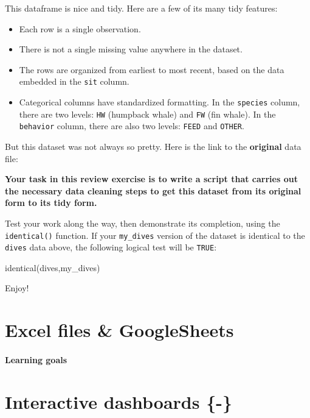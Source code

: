 \documentclass[
]{book}
\newenvironment{Shaded}{\begin{snugshade}}{\end{snugshade}}
\newcommand{\FunctionTok}[1]{\textcolor[rgb]{0.00,0.00,0.00}{#1}}
\newcommand{\NormalTok}[1]{#1}
\begin{document}
This dataframe is nice and tidy. Here are a few of its many tidy features:

\begin{itemize}
\item
  Each row is a single observation.
\item
  There is not a single missing value anywhere in the dataset.
\item
  The rows are organized from earliest to most recent, based on the data embedded in the \texttt{sit} column.
\item
  Categorical columns have standardized formatting. In the \texttt{species} column, there are two levels: \texttt{HW} (humpback whale) and \texttt{FW} (fin whale). In the \texttt{behavior} column, there are also two levels: \texttt{FEED} and \texttt{OTHER}.
\end{itemize}

But this dataset was not always so pretty. Here is the link to the \textbf{original} data file:

\textbf{Your task in this review exercise is to write a script that carries out the necessary data cleaning steps to get this dataset from its original form to its tidy form.}

Test your work along the way, then demonstrate its completion, using the \texttt{identical()} function. If your \texttt{my\_dives} version of the dataset is identical to the \texttt{dives} data above, the following logical test will be \texttt{TRUE}:

\begin{Shaded}
\begin{Highlighting}[]
\FunctionTok{identical}\NormalTok{(dives,my\_dives)}
\end{Highlighting}
\end{Shaded}

Enjoy!

\hypertarget{google}{%
\chapter{Excel files \& GoogleSheets}\label{google}}

\hypertarget{learning-goals-22}{%
\subsubsection*{Learning goals}\label{learning-goals-22}}

\hypertarget{shiny}{%
\chapter{Interactive dashboards \{-\}}\label{shiny}}
\end{document}
